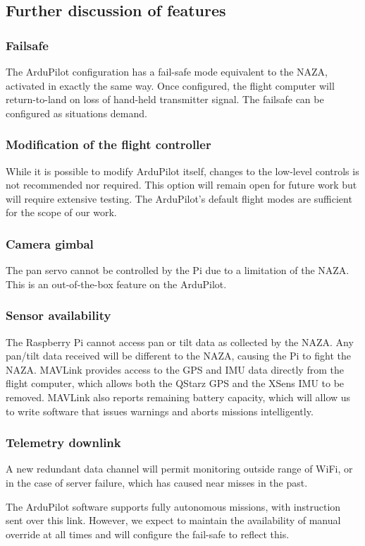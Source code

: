 \documentclass[a4paper, 11pt, titlepage]{article}
\begin{document}
\subsection{Further discussion of features}
\subsubsection{Failsafe}
The ArduPilot configuration has a fail-safe mode equivalent to the NAZA, activated in exactly the same way.  Once configured, the flight computer will return-to-land on loss of hand-held transmitter signal. The failsafe can be configured as situations demand.
\subsubsection{Modification of the flight controller}
While it is possible to modify ArduPilot itself, changes to the low-level controls is not recommended nor required. This option will remain open for future work but will require extensive testing. The ArduPilot’s default flight modes are sufficient for the scope of our work.
\subsubsection{Camera gimbal}
The pan servo cannot be controlled by the Pi due to a limitation of the NAZA. 
This is an out-of-the-box feature on the ArduPilot. 
\subsubsection{Sensor availability}
The Raspberry Pi cannot access  pan or tilt data as collected by the NAZA. Any  pan/tilt data received will be different to the NAZA, causing the Pi to fight the NAZA.
MAVLink provides access to the GPS and IMU data directly from the flight computer, which allows both the QStarz GPS and the XSens IMU to be removed. 
MAVLink also reports remaining battery capacity, which will allow us to write software that issues warnings and aborts missions intelligently.
\subsubsection{Telemetry downlink}
A new redundant data channel will permit monitoring outside range of WiFi, or in the case of server failure, which has caused near misses in the past.

The ArduPilot software supports fully autonomous missions, with instruction sent over this link. However, we expect to maintain the availability of manual override at all times and will configure the fail-safe to reflect this.
\end{document}
